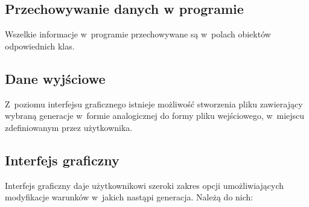 \documentclass[a4paper,11pt]{article}
\begin{document}
		\subsection{Przechowywanie danych w programie}
				Wszelkie informacje w~programie przechowywane są w~polach obiektów odpowiednich klas.
		\subsection{Dane wyjściowe }
				Z~poziomu interfejsu graficznego istnieje możliwość stworzenia pliku zawierający wybraną generacje w~formie analogicznej do formy pliku wejściowego, w~miejscu zdefiniowanym przez użytkownika.
		\subsection{Interfejs graficzny}
			Interfejs graficzny daje użytkownikowi szeroki zakres opcji umożliwiających modyfikacje warunków w~jakich nastąpi generacja. Należą do nich:
\end{document}
